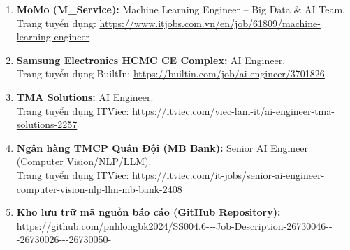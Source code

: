 \begin{enumerate}
    \item \textbf{MoMo (M\_Service):} Machine Learning Engineer -- Big Data \& AI Team. \\
    Trang tuyển dụng: \url{https://www.itjobs.com.vn/en/job/61809/machine-learning-engineer}
    
    \item \textbf{Samsung Electronics HCMC CE Complex:} AI Engineer. \\
    Trang tuyển dụng BuiltIn: \url{https://builtin.com/job/ai-engineer/3701826}
    
    \item \textbf{TMA Solutions:} AI Engineer. \\
    Trang tuyển dụng ITViec: \url{https://itviec.com/viec-lam-it/ai-engineer-tma-solutions-2257}
    
    \item \textbf{Ngân hàng TMCP Quân Đội (MB Bank):} Senior AI Engineer (Computer Vision/NLP/LLM). \\
    Trang tuyển dụng ITViec: \url{https://itviec.com/it-jobs/senior-ai-engineer-computer-vision-nlp-llm-mb-bank-2408}
    
    \item \textbf{Kho lưu trữ mã nguồn báo cáo (GitHub Repository):} \\
    \url{https://github.com/pnhlongbk2024/SS004.6---Job-Description-26730046---26730026---26730050-}
\end{enumerate}
